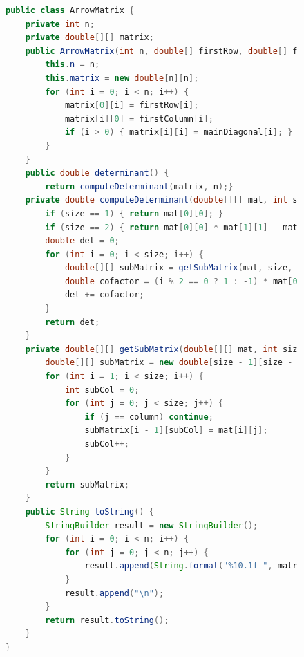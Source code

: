 \documentclass[a4paper, 14pt]{extarticle}
\begin{document}
\begin{figure}[!htb]
\begin{lstlisting}[language={java},caption={Файл ArrowMatrix.java},label={lst:code1}]
public class ArrowMatrix {
    private int n;
    private double[][] matrix;
    public ArrowMatrix(int n, double[] firstRow, double[] firstColumn, double[] mainDiagonal) {
        this.n = n;
        this.matrix = new double[n][n];
        for (int i = 0; i < n; i++) {
            matrix[0][i] = firstRow[i];
            matrix[i][0] = firstColumn[i];
            if (i > 0) { matrix[i][i] = mainDiagonal[i]; }
        }
    }
    public double determinant() {
        return computeDeterminant(matrix, n);}
    private double computeDeterminant(double[][] mat, int size) {
        if (size == 1) { return mat[0][0]; }
        if (size == 2) { return mat[0][0] * mat[1][1] - mat[0][1] * mat[1][0]; }
        double det = 0;
        for (int i = 0; i < size; i++) {
            double[][] subMatrix = getSubMatrix(mat, size, i);
            double cofactor = (i % 2 == 0 ? 1 : -1) * mat[0][i] * computeDeterminant(subMatrix, size - 1);
            det += cofactor;
        }
        return det;
    }
    private double[][] getSubMatrix(double[][] mat, int size, int column) {
        double[][] subMatrix = new double[size - 1][size - 1];
        for (int i = 1; i < size; i++) {
            int subCol = 0;
            for (int j = 0; j < size; j++) {
                if (j == column) continue;
                subMatrix[i - 1][subCol] = mat[i][j];
                subCol++;
            }
        }
        return subMatrix;
    }
    public String toString() {
        StringBuilder result = new StringBuilder();
        for (int i = 0; i < n; i++) {
            for (int j = 0; j < n; j++) {
                result.append(String.format("%10.1f ", matrix[i][j]));
            }
            result.append("\n");
        }
        return result.toString();
    }
}



\end{lstlisting}
\end{figure}
\end{document}
